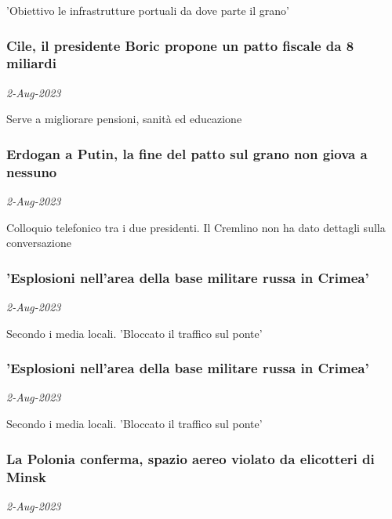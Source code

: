 'Obiettivo le infrastrutture portuali da dove parte il grano'
\subsubsection{Cile, il presidente Boric propone un patto fiscale da 8 miliardi \href{https://www.ansa.it/sito/notizie/mondo/americalatina/2023/08/02/cile-il-presidente-boric-propone-un-patto-fiscale-da-8-miliardi_f2cd96f0-2f16-49ea-b96e-0ec0267a1a3d.html}{}}
\textit{2-Aug-2023}

Serve a migliorare pensioni, sanit\`{a} ed educazione
\subsubsection{Erdogan a Putin, la fine del patto sul grano non giova a nessuno \href{https://www.ansa.it/sito/notizie/mondo/europa/2023/08/02/-erdogan-a-putin-fine-patto-grano-non-giova-a-nessuno-_fcf48a96-d4b7-4aa4-beb9-9429d5329eaf.html}{}}
\textit{2-Aug-2023}

Colloquio telefonico tra i due presidenti. Il Cremlino non ha dato dettagli sulla conversazione
\subsubsection{'Esplosioni nell'area della base militare russa in Crimea' \href{https://www.ansa.it/sito/notizie/mondo/2023/08/02/esplosioni-nellarea-della-base-militare-russa-in-crimea_11691e47-f505-401d-8aab-5ca228a7d847.html}{}}
\textit{2-Aug-2023}

Secondo i media locali. 'Bloccato il traffico sul ponte'
\subsubsection{'Esplosioni nell'area della base militare russa in Crimea' \href{https://www.ansa.it/sito/notizie/mondo/2023/08/02/esplosioni-nellarea-della-base-militare-russa-in-crimea_b5b19129-c7b1-4d42-91eb-58b5811b164b.html}{}}
\textit{2-Aug-2023}

Secondo i media locali. 'Bloccato il traffico sul ponte'
\subsubsection{La Polonia conferma, spazio aereo violato da elicotteri di Minsk \href{https://www.ansa.it/sito/notizie/mondo/2023/08/02/la-polonia-conferma-spazio-aereo-violato-da-elicotteri-di-minsk_443de250-78aa-471e-8747-5f0dcaefafd1.html}{}}
\textit{2-Aug-2023}

